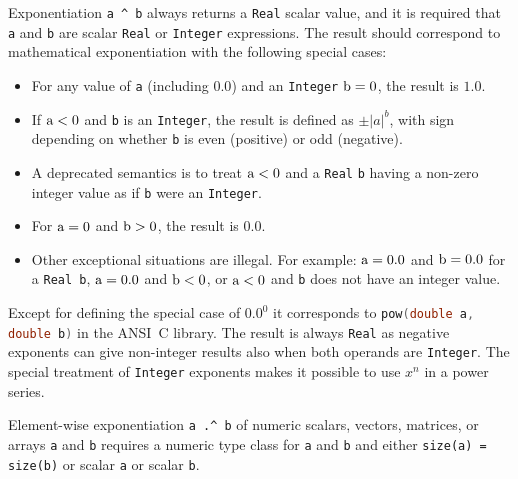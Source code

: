 Exponentiation \lstinline!a ^ b! always returns a \lstinline!Real! scalar value, and it is required that \lstinline!a! and \lstinline!b! are scalar \lstinline!Real! or \lstinline!Integer! expressions.
The result should correspond to mathematical exponentiation with the following special cases:
\begin{itemize}
\item For any value of \lstinline!a! (including $0.0$) and an \lstinline!Integer! $\text{\lstinline!b!} = 0$, the result is $1.0$.
\item If $\text{\lstinline!a!} < 0$ and \lstinline!b! is an \lstinline!Integer!, the result is defined as $\pm |a|^b$, with sign depending on whether \lstinline!b! is even (positive) or odd (negative).
\item A deprecated semantics is to treat $\text{\lstinline!a!} < 0$ and a \lstinline!Real! \lstinline!b! having a non-zero integer value as if \lstinline!b! were an \lstinline!Integer!.
\item For $\text{\lstinline!a!} = 0$ and $\text{\lstinline!b!} > 0$, the result is $0.0$.
\item
  Other exceptional situations are illegal.
  For example: $\text{\lstinline!a!} = 0.0$ and $\text{\lstinline!b!} = 0.0$ for a \lstinline!Real b!, $\text{\lstinline!a!} = 0.0$ and $\text{\lstinline!b!} < 0$, or $\text{\lstinline!a!} < 0$ and \lstinline!b! does not have an integer value.
\end{itemize}

\begin{nonnormative}
Except for defining the special case of $0.0^0$ it corresponds to \lstinline[language=C]!pow(double a, double b)! in the ANSI~C library.
The result is always \lstinline!Real! as negative exponents can give non-integer results also when both operands are \lstinline!Integer!.
The special treatment of \lstinline!Integer! exponents makes it possible to use $x^n$ in a power series.
\end{nonnormative}

Element-wise exponentiation \lstinline!a .^ b! of numeric scalars, vectors, matrices, or arrays \lstinline!a! and \lstinline!b! requires a numeric type class for
\lstinline!a! and \lstinline!b! and either \lstinline!size(a) = size(b)! or scalar \lstinline!a! or scalar \lstinline!b!.

